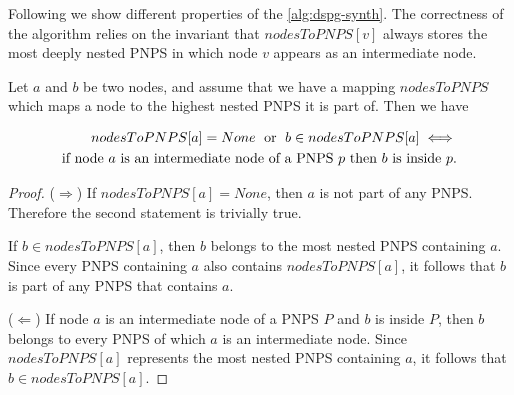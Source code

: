 Following we show different properties of the \cref{alg:dspg-synth}. The correctness of the algorithm relies on the invariant that $nodesToPNPS[v]$ always stores the most deeply nested  \ac{PNPS} in which node $v$ appears as an intermediate node.
\begin{theorem}
Let $a$ and $b$ be two nodes, and assume that we have a mapping 
$nodesToPNPS$ which maps a node to the highest nested PNPS it is part of.
Then we have

\begin{align}
    nodesToPNPS[a] = None \; \text{ or }\; b \in nodesToPNPS[a]
\iff \notag \\
\text{if node } a \text{ is an intermediate node of a PNPS } p
\text{ then } b \text{ is inside } p . \notag 
\end{align}


\end{theorem}
\begin{proof}

($\Rightarrow$)
If $nodesToPNPS[a] = None$, then $a$ is not part of any PNPS.
Therefore the second statement is trivially true.

If $b \in nodesToPNPS[a]$, then $b$ belongs to the most nested PNPS
containing $a$. Since every PNPS containing $a$ also contains
$nodesToPNPS[a]$, it follows that $b$ is part of any PNPS that
contains $a$.

($\Leftarrow$)
If node $a$ is an intermediate node of a PNPS $P$ and $b$ is inside $P$,
then $b$ belongs to every PNPS of which $a$ is an intermediate node.
Since $nodesToPNPS[a]$ represents the most nested PNPS containing $a$,
it follows that $b \in nodesToPNPS[a]$.

\end{proof}

